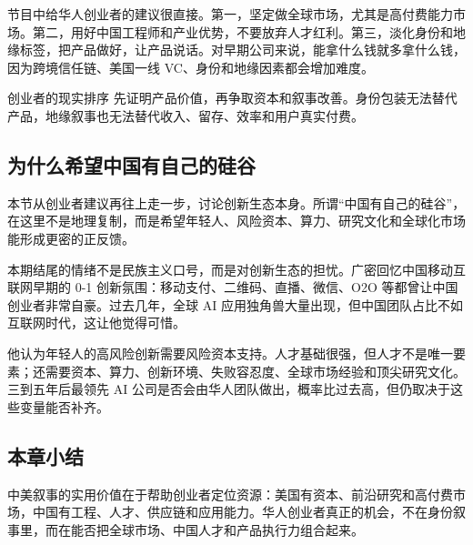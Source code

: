 节目中给华人创业者的建议很直接。第一，坚定做全球市场，尤其是高付费能力市场。第二，用好中国工程师和产业优势，不要放弃人才红利。第三，淡化身份和地缘标签，把产品做好，让产品说话。对早期公司来说，能拿什么钱就多拿什么钱，因为跨境信任链、美国一线 VC、身份和地缘因素都会增加难度。

\begin{importantbox}{创业者的现实排序}
先证明产品价值，再争取资本和叙事改善。身份包装无法替代产品，地缘叙事也无法替代收入、留存、效率和用户真实付费。
\end{importantbox}

\subsection{为什么希望中国有自己的硅谷}

本节从创业者建议再往上走一步，讨论创新生态本身。所谓“中国有自己的硅谷”，在这里不是地理复制，而是希望年轻人、风险资本、算力、研究文化和全球化市场能形成更密的正反馈。

本期结尾的情绪不是民族主义口号，而是对创新生态的担忧。广密回忆中国移动互联网早期的 0-1 创新氛围：移动支付、二维码、直播、微信、O2O 等都曾让中国创业者非常自豪。过去几年，全球 AI 应用独角兽大量出现，但中国团队占比不如互联网时代，这让他觉得可惜。

他认为年轻人的高风险创新需要风险资本支持。人才基础很强，但人才不是唯一要素；还需要资本、算力、创新环境、失败容忍度、全球市场经验和顶尖研究文化。三到五年后最领先 AI 公司是否会由华人团队做出，概率比过去高，但仍取决于这些变量能否补齐。

\subsection{本章小结}

中美叙事的实用价值在于帮助创业者定位资源：美国有资本、前沿研究和高付费市场，中国有工程、人才、供应链和应用能力。华人创业者真正的机会，不在身份叙事里，而在能否把全球市场、中国人才和产品执行力组合起来。

